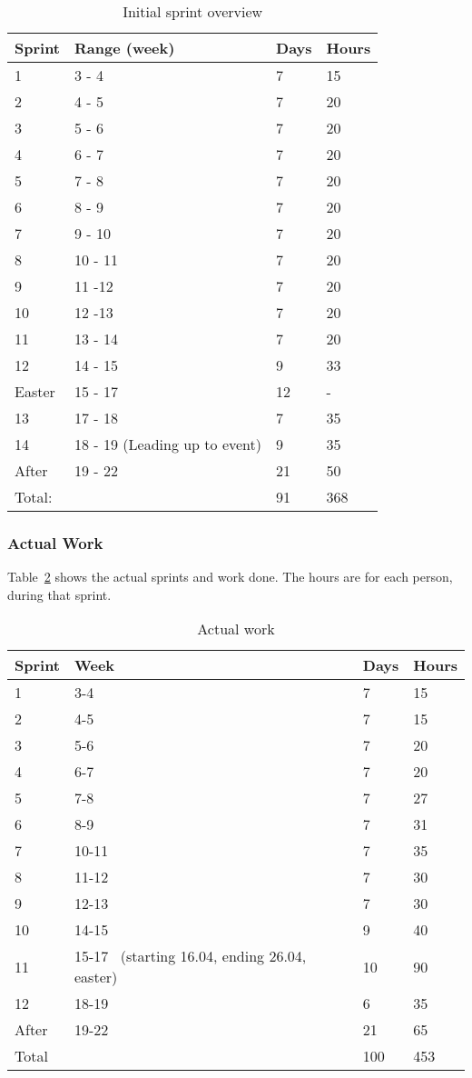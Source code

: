 \begin{longtable}{|l|l|l|l|}
\caption{Initial sprint overview} \label{table:sprintoverview} \\
\hline
 Sprint & Range (week) & Days &
 Hours\\\hline
 1 & 3 - 4 & 7 & 15\\\hline
 2 & 4 - 5 & 7 & 20\\\hline
 3 & 5 - 6 & 7 & 20 \\\hline
 4 & 6 - 7 & 7 & 20 \\\hline
 5 & 7 - 8 & 7 & 20\\\hline
 6 & 8 - 9 & 7 & 20\\\hline
 7 & 9 - 10 & 7 & 20\\\hline
 8 & 10 - 11 & 7 & 20\\\hline
 9 & 11 -12 & 7 & 20\\\hline
 10 & 12 -13 & 7 & 20\\\hline
 11 & 13 - 14 & 7 & 20\\\hline
 12 & 14 - 15 & 9 & 33\\\hline
 Easter & 15 - 17 & 12 & {}-\\\hline
 13 & 17 - 18 & 7 & 35\\\hline
 14 & 18 - 19 (Leading up to event) & 9 & 35\\\hline
 After & 19 - 22 & 21 & 50\\\hline
 Total: & & 91 & 368\\\hline
\end{longtable}


\pagebreak
\subsubsection{Actual Work}
Table~\ref{table:actualWork} shows the actual sprints and work done. The hours
are for each person, during that sprint.
\begin{longtable}{|l|l|l|l|}
\caption{Actual work} \label{table:actualWork} \\
\hline
 Sprint & Week & Days & Hours \\\hline
 1 & 3-4 & 7 & 15\\\hline
 2 & 4-5  & 7  & 15\\\hline
 3 & 5-6 & 7  & 20\\\hline
 4 & 6-7 & 7 & 20\\\hline
 5 & 7-8 & 7 & 27\\\hline
 6 & 8-9  & 7  & 31\\\hline
 7 & 10-11 & 7  & 35\\\hline
 8 & 11-12 & 7 & 30\\\hline
 9 & 12-13 & 7  & 30\\\hline
 10 & 14-15 & 9 & 40\\\hline
 11 & 15-17 \ (starting 16.04, ending 26.04, easter) & 10 & 90\\\hline
 12 & 18-19 & 6 & 35\\\hline
 After & 19-22 & 21 & 65\\\hline
 Total & & 100 & 453\\\hline
\end{longtable}
